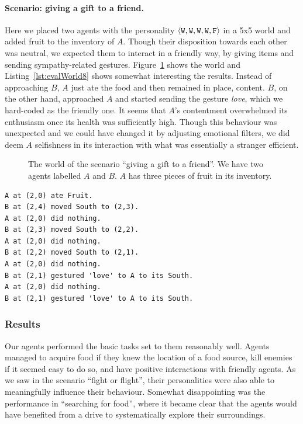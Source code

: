 \paragraph{Scenario: giving a gift to a friend.} Here we placed two agents with the personality $\langle \mathtt{W},\mathtt{W}, \mathtt{W}, \mathtt{W}, \mathtt{F} \rangle$ in a 5x5 world and added fruit to the inventory of $A$. Though their disposition towards each other was neutral, we expected them to interact in a friendly way, by giving items and sending sympathy-related gestures. Figure~\ref{fig:evalWorld8} shows the world and Listing~\ref{lst:evalWorld8} shows somewhat interesting the results. Instead of approaching $B$, $A$ just ate the food and then remained in place, content. $B$, on the other hand, approached $A$ and started sending the gesture \emph{love}, which we hard-coded as the friendly one. It seems that $A$'s contentment overwhelmed its enthusiasm once its health was sufficiently high. Though this behaviour was unexpected and we could have changed it by adjusting emotional filters, we did deem $A$ selfishness in its interaction with what was essentially a stranger efficient.

\begin{figure}
    \centering
    
    \caption{The world of the scenario ``giving a gift to a friend''. We have two agents labelled $A$ and $B$. $A$ has three pieces of fruit in its inventory.}
    \label{fig:evalWorld8}
\end{figure}

\begin{lstlisting}[caption=Actions in the scenario ``giving a gift to a friend''., label=lst:evalWorld8]
A at (2,0) ate Fruit.
B at (2,4) moved South to (2,3).
A at (2,0) did nothing.
B at (2,3) moved South to (2,2).
A at (2,0) did nothing.
B at (2,2) moved South to (2,1).
A at (2,0) did nothing.
B at (2,1) gestured 'love' to A to its South.
A at (2,0) did nothing.
B at (2,1) gestured 'love' to A to its South.
\end{lstlisting}

\subsubsection{Results}

Our agents performed the basic tasks set to them reasonably well. Agents managed to acquire food if they knew the location of a food source, kill enemies if it seemed easy to do so, and have positive interactions with friendly agents. As we saw in the scenario ``fight or flight'', their personalities were also able to meaningfully influence their behaviour. Somewhat disappointing was the performance in ``searching for food'', where it became clear that the agents would have benefited from a drive to systematically explore their surroundings.

